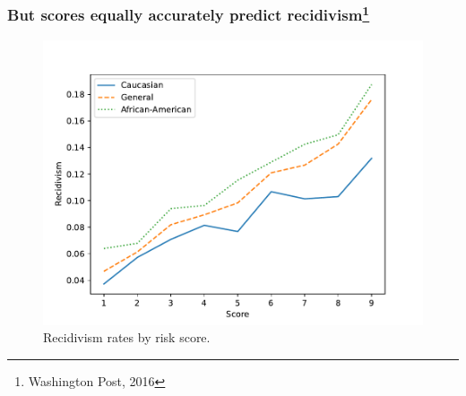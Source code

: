 \begin{frame}
  \frametitle{But scores equally accurately predict recidivism\footnote{Washington Post, 2016}}
  \begin{figure}[H]
    \centering
    \includegraphics[width=\columnwidth]{../figures/calibration-compas}
    \caption{Recidivism rates by risk score.}
    \label{fig:imrs}
  \end{figure}
\end{frame}
